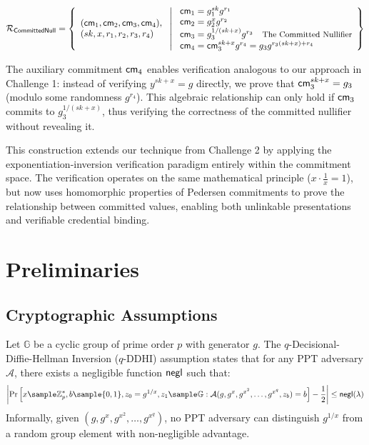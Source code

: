 \[
\mathcal{R}_{\mathsf{CommittedNull}} = \left\{ 
\begin{array}{l} 
(\mathsf{cm}_1, \mathsf{cm}_2, \mathsf{cm}_3, \mathsf{cm}_4), \\
(sk, x, r_1, r_2, r_3, r_4) 
\end{array}
\ \middle| \
\begin{array}{l}
\mathsf{cm}_1 = g_1^{sk} g^{r_1} \\
\mathsf{cm}_2 = g_2^{x} g^{r_2} \\
\mathsf{cm}_3 = g_3^{1/(sk + x)} g^{r_3}  \quad \text{\small{The Committed Nullifier}}\\
\mathsf{cm}_4 = \mathsf{cm}_3^{sk + x} g^{r_4} = g_3 g^{r_3 (sk + x) + r_4}
\end{array} \right\}
\]

The auxiliary commitment $\mathsf{cm}_4$ enables verification analogous to our approach in Challenge 1: instead of verifying $y^{sk+x} = g$ directly, we prove that $\mathsf{cm}_3^{sk+x} = g_3$ (modulo some randomness $g^{r_4}$). This algebraic relationship can only hold if $\mathsf{cm}_3$ commits to $g_3^{1/(sk+x)}$, thus verifying the correctness of the committed nullifier without revealing it.

This construction extends our technique from Challenge 2 by applying the exponentiation-inversion verification paradigm entirely within the commitment space. The verification operates on the same mathematical principle ($x \cdot \frac{1}{x} = 1$), but now uses homomorphic properties of Pedersen commitments to prove the relationship between committed values, enabling both unlinkable presentations and verifiable credential binding.








\section{Preliminaries}

\subsection{Cryptographic Assumptions}

\begin{definition}
Let $\mathbb{G}$ be a cyclic group of prime order $p$ with generator $g$. The $q$-Decisional-Diffie-Hellman Inversion ($q$-DDHI) \cite{mitsunari_new_2002} assumption states that for any PPT adversary $\mathcal{A}$, there exists a negligible function $\mathsf{negl}$ such that:
\[
\left|\Pr\left[ x \sample \Zp^*, b \sample \{0,1\}, z_0 = g^{1/x}, z_1 \sample \G : \mathcal{A}(g, g^x, g^{x^2}, \ldots, g^{x^q}, z_b) = b \right] - \frac{1}{2}\right| \leq \negl(\lambda)
\]
Informally, given $(g, g^x, g^{x^2}, \ldots, g^{x^q})$, no PPT adversary can distinguish $g^{1/x}$ from a random group element with non-negligible advantage.
\end{definition}


